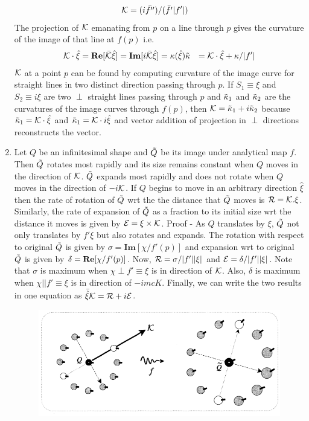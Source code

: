 \documentclass[12pt]{article}
\def\mc{\ensuremath\mathcal}
\def\mf{\ensuremath\mathbf}
\def\td{\ensuremath\tilde}
\begin{document}
\begin{enumerate}
        \begin{align*}
            \mc{K} &= (i\bar{f''})/(\bar{f'}|f'|)
        \end{align*}
        The projection of $\mc{K}$ emanating from $p$ on a line through $p$ gives the curvature of the image of that line at $f(p)$ i.e.
        \begin{align*}
            \mc{K} \cdot \hat{\xi} &= \mf{Re}[\bar{\mc{K}}\hat{\xi}] = \mf{Im}[i\bar{\mc{K}}\hat{\xi}] = \kappa(\hat{\xi})
            \td{\kappa} &= \mc{K}\cdot \hat{\xi} + \kappa/|f'|
        \end{align*}
        $\mc{K}$ at a point $p$ can be found by computing curvature of the image curve for straight lines in two distinct direction passing through $p$. If $S_1 \equiv \xi$ and $S_2 \equiv i\xi$ are two $\perp$ straight lines passing through $p$ and $\td{\kappa}_1$ and $\td{\kappa}_2$ are the curvatures of the image curves through $f(p)$, then $\mc{K} = \td{\kappa}_1 + i\td{\kappa}_2$ because $\td{\kappa}_1 = \mc{K}\cdot \hat{\xi}$ and $\td{\kappa}_1 = \mc{K}\cdot i\hat{\xi}$ and vector addition of projection in $\perp$ directions reconstructs the vector.
        \item Let $Q$ be an infinitesimal shape and $\td{Q}$ be its image under analytical map $f$. Then $\td{Q}$ rotates most rapidly and its size remains constant when $Q$ moves in the direction of $\mc{K}$. $\td{Q}$ expands most rapidly and does not rotate when $Q$ moves in the direction of $-i\mc{K}$. If $Q$ begins to move in an arbitrary direction $\hat{\xi}$ then the rate of rotation of $\td{Q}$ wrt the the distance that $\td{Q}$ moves is $\mc{R} = \mc{K}.\xi$. Similarly, the rate of expansion of $\td{Q}$ as a fraction to its initial size wrt the distance it moves is given by $\mc{E} = \xi \times \mc{K}$. Proof - As $Q$ translates by $\xi$, $\td{Q}$ not only translates by $f' \xi$ but also rotates and expands. The rotation with respect to original $\td{Q}$ is given by $\sigma = \mathbf{Im}[\chi/f'(p)]$ and expansion wrt to original $\td{Q}$ is given by $\delta = \mf{Re}[\chi/f'(p)]$. Now, $\mc{R} = \sigma/|f'||\xi|$ and $\mc{E} = \delta/|f'||\xi|$. Note that $\sigma$ is maximum when $\chi \perp f' \equiv \xi $ is in direction of $\mc{K}$. Also, $\delta$ is maximum when $\chi || f' \equiv \xi$ is in direction of $-imc{K}$. Finally, we can write the two results in one equation as $\bar{\hat{\xi}}\mc{K} = \mc{R} + i \mc{E}$.
        \begin{figure}[h!]
            \centering
            \includegraphics[scale=0.75]{qmotion}

\end{figure}
\end{enumerate}
\end{document}
